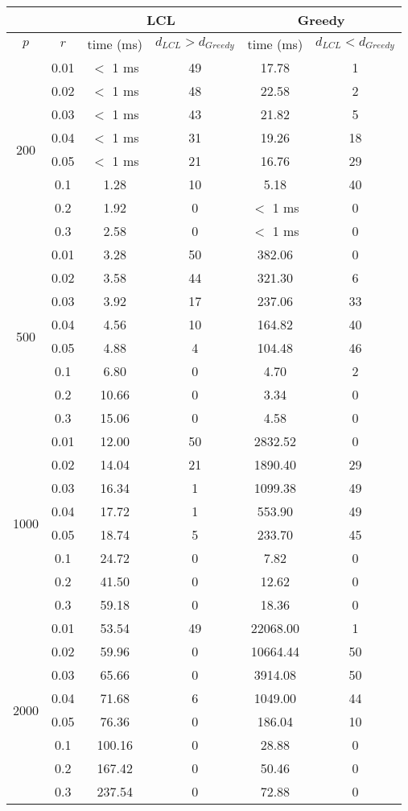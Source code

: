 \begin{tabular}{| c | c | c | c | c | c | }
	\hline
	& & \multicolumn{2}{c|}{LCL} & \multicolumn{2}{c|}{Greedy}\\
	\hline
	$p$ & $r$ & time (ms) & $d_{LCL} > d_{Greedy}$ & time (ms) &  $d_{LCL} < d_{Greedy}$ \\
	\hline
	\multirow{8}{*}{200} & 0.01 & $<$ 1 ms & 49 & 17.78 & 1\\
	\cline{2-6}
	& 0.02 & $<$ 1 ms & 48 & 22.58 & 2\\
	\cline{2-6}
	& 0.03 & $<$ 1 ms & 43 & 21.82 & 5\\
	\cline{2-6}
	& 0.04 & $<$ 1 ms & 31 & 19.26 & 18\\
	\cline{2-6}
	& 0.05 & $<$ 1 ms & 21 & 16.76 & 29\\
	\cline{2-6}
	& 0.1 & 1.28 & 10 & 5.18 & 40\\
	\cline{2-6}
	& 0.2 & 1.92 & 0 & $<$ 1 ms & 0\\
	\cline{2-6}
	& 0.3 & 2.58 & 0 & $<$ 1 ms & 0\\
	\hline
	\multirow{8}{*}{500} & 0.01 & 3.28 & 50 & 382.06 & 0\\
	\cline{2-6}
	& 0.02 & 3.58 & 44 & 321.30 & 6\\
	\cline{2-6}
	& 0.03 & 3.92 & 17 & 237.06 & 33\\
	\cline{2-6}
	& 0.04 & 4.56 & 10 & 164.82 & 40\\
	\cline{2-6}
	& 0.05 & 4.88 & 4 & 104.48 & 46\\
	\cline{2-6}
	& 0.1 & 6.80 & 0 & 4.70 & 2\\
	\cline{2-6}
	& 0.2 & 10.66 & 0 & 3.34 & 0\\
	\cline{2-6}
	& 0.3 & 15.06 & 0 & 4.58 & 0\\
	\hline
	\multirow{8}{*}{1000} & 0.01 & 12.00 & 50 & 2832.52 & 0\\
	\cline{2-6}
	& 0.02 & 14.04 & 21 & 1890.40 & 29\\
	\cline{2-6}
	& 0.03 & 16.34 & 1 & 1099.38 & 49\\
	\cline{2-6}
	& 0.04 & 17.72 & 1 & 553.90 & 49\\
	\cline{2-6}
	& 0.05 & 18.74 & 5 & 233.70 & 45\\
	\cline{2-6}
	& 0.1 & 24.72 & 0 & 7.82 & 0\\
	\cline{2-6}
	& 0.2 & 41.50 & 0 & 12.62 & 0\\
	\cline{2-6}
	& 0.3 & 59.18 & 0 & 18.36 & 0\\
	\hline
	\multirow{8}{*}{2000} & 0.01 & 53.54 & 49 & 22068.00 & 1\\
	\cline{2-6}
	& 0.02 & 59.96 & 0 & 10664.44 & 50\\
	\cline{2-6}
	& 0.03 & 65.66 & 0 & 3914.08 & 50\\
	\cline{2-6}
	& 0.04 & 71.68 & 6 & 1049.00 & 44\\
	\cline{2-6}
	& 0.05 & 76.36 & 0 & 186.04 & 10\\
	\cline{2-6}
	& 0.1 & 100.16 & 0 & 28.88 & 0\\
	\cline{2-6}
	& 0.2 & 167.42 & 0 & 50.46 & 0\\
	\cline{2-6}
	& 0.3 & 237.54 & 0 & 72.88 & 0\\
	\hline
\end{tabular}
